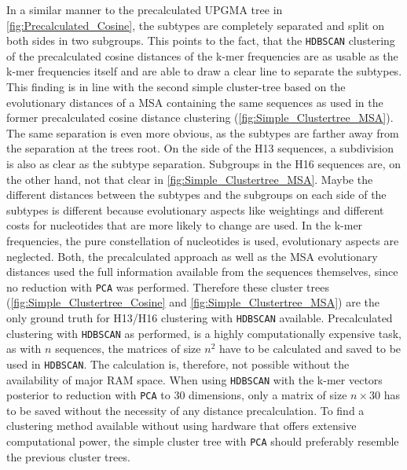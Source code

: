 In a similar manner to the precalculated \gls{UPGMA} tree in \autoref{fig:Precalculated_Cosine}, the subtypes are completely separated and split on both sides in two subgroups. This points to the fact, that the \texttt{HDBSCAN} clustering of the precalculated cosine distances of the k-mer frequencies are as usable as the k-mer frequencies itself and are able to draw a clear line to separate the subtypes. This finding is in line with the second simple cluster-tree based on the evolutionary distances of a \gls{MSA} containing the same sequences as used in the former precalculated cosine distance clustering (\autoref{fig:Simple_Clustertree_MSA}). The same separation is even more obvious, as the subtypes are farther away from the separation at the trees root. On the side of the H13 sequences, a subdivision is also as clear as the subtype separation. Subgroups in the H16 sequences are, on the other hand, not that clear in \autoref{fig:Simple_Clustertree_MSA}. Maybe the different distances between the subtypes and the subgroups on each side of the subtypes is different because evolutionary aspects like weightings and different costs for nucleotides that are more likely to change are used. In the k-mer frequencies, the pure constellation of nucleotides is used, evolutionary aspects are neglected. Both, the precalculated approach as well as the \gls{MSA} evolutionary distances used the full information available from the sequences themselves, since no reduction with \texttt{PCA} was performed. Therefore these cluster trees (\autoref{fig:Simple_Clustertree_Cosine} and \autoref{fig:Simple_Clustertree_MSA}) are the only ground truth for H13/H16 clustering with \texttt{HDBSCAN} available. Precalculated clustering with \texttt{HDBSCAN} as performed, is a highly computationally expensive task, as with $n$ sequences, the matrices of size $n^2$ have to be calculated and saved to be used in \texttt{HDBSCAN}. The calculation is, therefore, not possible without the availability of major RAM space. When using \texttt{HDBSCAN} with the k-mer vectors posterior to reduction with \texttt{PCA} to 30 dimensions, only a matrix of size $n\times 30$ has to be saved without the necessity of any distance precalculation. To find a clustering method available without using hardware that offers extensive computational power, the simple cluster tree with \texttt{PCA} should preferably resemble the previous cluster trees.


